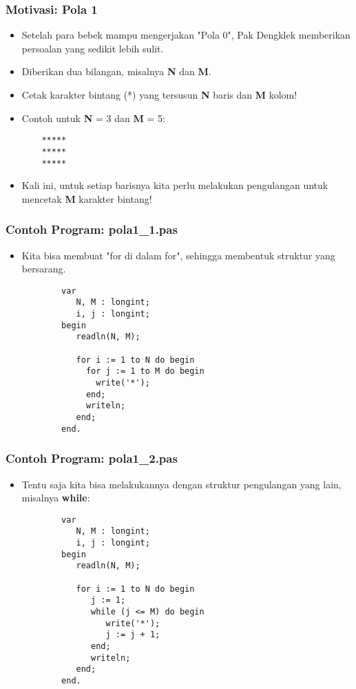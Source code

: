 \documentclass{beamer}
\begin{document}
\begin{frame}[fragile]
\frametitle{Motivasi: Pola 1}
\begin{itemize}
	\item Setelah para bebek mampu mengerjakan "Pola 0", Pak Dengklek memberikan persoalan yang sedikit lebih sulit.
	\item Diberikan dua bilangan, misalnya \textbf{N} dan \textbf{M}.
	\item Cetak karakter bintang (*) yang tersusun \textbf{N} baris dan \textbf{M} kolom!
	
	\item Contoh untuk \textbf{N} = 3 dan \textbf{M} = 5:
	\begin{lstlisting}
	*****
	*****
	*****
	\end{lstlisting}
	
	\item Kali ini, untuk setiap barisnya kita perlu melakukan pengulangan untuk mencetak \textbf{M} karakter bintang!
\end{itemize}
\end{frame}

\begin{frame}[fragile]
\frametitle{Contoh Program: pola1\_1.pas}
\begin{itemize}
	\item Kita bisa membuat "for di dalam for", sehingga membentuk struktur yang bersarang.
	\begin{lstlisting}
		var
		   N, M : longint;
		   i, j : longint;
		begin
		   readln(N, M);
		
		   for i := 1 to N do begin
		     for j := 1 to M do begin
		       write('*');
		     end;
		     writeln;
		   end;
		end.
	\end{lstlisting}
\end{itemize}
\end{frame}

\begin{frame}[fragile]
\frametitle{Contoh Program: pola1\_2.pas}
\begin{itemize}
	\item Tentu saja kita bisa melakukannya dengan struktur pengulangan yang lain, misalnya \textbf{while}:
	\begin{lstlisting}
		var
		   N, M : longint;
		   i, j : longint;
		begin
		   readln(N, M);
		
		   for i := 1 to N do begin
		      j := 1;
		      while (j <= M) do begin
		         write('*');
		         j := j + 1;
		      end;
		      writeln;
		   end;
		end.
	\end{lstlisting}
\end{itemize}
\end{frame}
\end{document}
